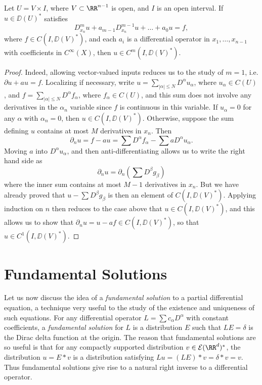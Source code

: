 \begin{theorem}
    Let $U = V \times I$, where $V \subset \RR^{n-1}$ is open, and $I$ is an open interval. If $u \in \DD(U)^*$ satisfies
    \[ D_{x_n}^m u + a_{m-1} D_{x_n}^{m-1} u + \dots + a_0 u = f, \]
    where $f \in C(I, \DD(V)^*)$, and each $a_i$ is a differential operator in $x_1,\dots,x_{n-1}$ with coefficients in $C^\infty(X)$, then $u \in C^m(I,\DD(V)^*)$.
\end{theorem}
\begin{proof}
    Indeed, allowing vector-valued inputs reduces us to the study of $m = 1$, i.e. $\partial u + a u = f$. Localizing if necessary, write $u = \sum_{|\alpha| \leq N} D^\alpha u_\alpha$, where $u_\alpha \in C(U)$, and $f = \sum_{|\alpha| \leq N} D^\alpha f_\alpha$, where $f_\alpha \in C(U)$, and this sum does not involve any derivatives in the $\alpha_n$ variable since $f$ is continuous in this variable. If $u_\alpha = 0$ for any $\alpha$ with $\alpha_n = 0$, then $u \in C(I,\DD(V)^*)$. Otherwise, suppose the sum defining $u$ contains at most $M$ derivatives in $x_n$. Then
    \[ \partial_n u = f - a u = \sum D^\alpha f_\alpha - \sum a D^\alpha u_\alpha. \]
    Moving $a$ into $D^\alpha u_\alpha$, and then anti-differentiating allows us to write the right hand side as
    \[ \partial_n u = \partial_n ( \sum D^\beta g_\beta ) \]
    where the inner sum contains at most $M-1$ derivatives in $x_n$. But we have already proved that $u - \sum D^\beta g_\beta$ is then an element of $C(I,\DD(V)^*)$. Applying induction on $n$ then reduces to the case above that $u \in C(I,\DD(V)^*)$, and this allows us to show that $\partial_n u = u - a f \in C(I,\DD(V)^*)$, so that $u \in C^1(I,\DD(V)^*)$.
\end{proof}

\section{Fundamental Solutions}

Let us now discuss the idea of a \emph{fundamental solution} to a partial differential equation, a technique very useful to the study of the existence and uniqueness of such equations. For any differential operator $L = \sum c_\alpha D^\alpha$ with constant coefficients, a \emph{fundamental solution} for $L$ is a distribution $E$ such that $LE = \delta$ is the Dirac delta function at the origin. The reason that fundamental solutions are so useful is that for any compactly supported distribution $v \in \mathcal{E}(\RR^d)^*$, the distribution $u = E * v$ is a distribution satisfying $L u = (L E) * v = \delta * v = v$. Thus fundamental solutions give rise to a natural right inverse to a differential operator.


